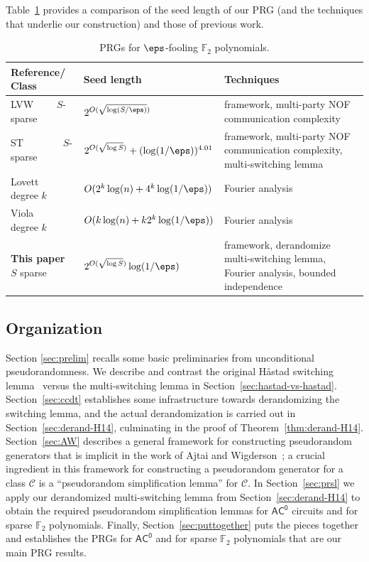 \documentclass[11pt]{article}
\numberwithin{equation}{section}
\theoremstyle{definition}
\theoremstyle{plain}
\theoremstyle{plain}
\newcommand{\acz}{\mathsf{AC^0}}
\renewcommand{\F}{\mathds{F}}
\begin{document}
Table~\ref{table:F2} provides a comparison of the seed length of our PRG (and the techniques that underlie our construction) and those of previous work. 


\begin{table}[h]
\renewcommand{\arraystretch}{1.6}
\centering
\begin{tabular}{|m{6em}|m{11.5em}|m{21em}|}
\hline
 Reference/ Class&  Seed length & Techniques \\ \hline
\cite{LVW93} LVW $\text{~~~~~}$ $S$-sparse & $2^{O(\sqrt{\log(S/\eps)})}$ & \cite{NW94} framework, \cite{BNS92} multi-party NOF communication complexity\\ 
\hline
\cite{ST18} ST $\text{~~~~~~~~~~}$ $S$-sparse & $2^{O(\sqrt{\log S})} + (\log(1/\eps))^{4.01}$  & \cite{NW94} framework, \cite{BNS92} multi-party NOF communication complexity, \cite{Has14} multi-switching lemma\\ 
\hline
\cite{Lov09} Lovett $\text{~~~~~}$ degree $k$ & $O(2^k \log(n) + 4^{k} \log(1/\eps))$ & Fourier analysis \\ \hline 
\cite{Vio09} Viola $\text{~~~~~~}$ degree $k$ & $O(k\log(n) + k2^{k}\log(1/\eps))$  & Fourier analysis \\ \hline  \hline
%
{\bf This paper}   %
\text{~~} $S$ sparse & $2^{O(\sqrt{\log S})}  \log(1/\eps)$ & \cite{AjtaiWigderson:85} framework, derandomize~\cite{Has14} multi-switching lemma,
Fourier analysis, bounded independence\\ \hline
 \end{tabular}
 \caption{PRGs for $\eps$-fooling $\F_2$ polynomials.}
 \label{table:F2}
 \end{table}

%
%

\subsection{Organization}
Section \ref{sec:prelim} recalls some basic preliminaries from unconditional pseudorandomness.
We describe and contrast the original H{\aa}stad switching lemma~\cite{Hastad86} versus the \cite{Has14} multi-switching lemma in Section~\ref{sec:hastad-vs-hastad}.
Section~\ref{sec:ccdt} establishes some infrastructure towards derandomizing the \cite{Has14} switching lemma, and the actual derandomization is carried out in Section~\ref{sec:derand-H14}, culminating in the proof of Theorem~\ref{thm:derand-H14}.
Section~\ref{sec:AW} describes a general framework for constructing pseudorandom generators that is implicit in the work of Ajtai and Wigderson~\cite{AjtaiWigderson:85}; a crucial ingredient in this framework for constructing a pseudorandom generator for a class $\mathscr{C}$ is a ``pseudorandom simplification lemma'' for $\mathscr{C}.$  In Section~\ref{sec:prsl} we apply our derandomized multi-switching lemma from Section~\ref{sec:derand-H14} to obtain the required pseudorandom simplification lemmas for $\acz$ circuits and for sparse $\F_2$ polynomials.  Finally, Section~\ref{sec:puttogether} puts the pieces together and establishes the PRGs for $\acz$ and for sparse $\F_2$ polynomials that are our main PRG results.
\end{document}
